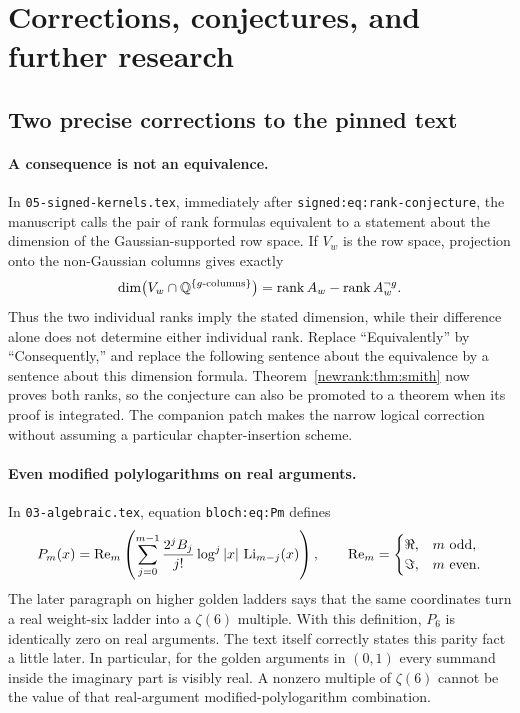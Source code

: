 \section{Corrections, conjectures, and further research}
\label{sec:research-program}

\subsection{Two precise corrections to the pinned text}

\paragraph{A consequence is not an equivalence.}
In \texttt{05-signed-kernels.tex}, immediately after
\texttt{signed:eq:rank-conjecture}, the manuscript calls the pair of rank
formulas equivalent to a statement about the dimension of the
Gaussian-supported row space. If $V_w$ is the row space, projection onto
the non-Gaussian columns gives exactly
\[
 \dim\bigl(V_w\cap\mathbb Q^{\{g\text{-columns}\}}\bigr)
 =\operatorname{rank} A_w-\operatorname{rank} A_w^{\neg g}.
\]
Thus the two individual ranks imply the stated dimension, while their
difference alone does not determine either individual rank. Replace
``Equivalently'' by ``Consequently,'' and replace the following sentence
about the equivalence by a sentence about this dimension formula.
Theorem~\ref{newrank:thm:smith} now proves both ranks, so the conjecture can
also be promoted to a theorem when its proof is integrated. The companion
patch makes the narrow logical correction without assuming a particular
chapter-insertion scheme.

\paragraph{Even modified polylogarithms on real arguments.}
In \texttt{03-algebraic.tex}, equation \texttt{bloch:eq:Pm} defines
\[
 P_m(x)=\operatorname{Re}_m\left(
       \sum_{j=0}^{m-1}\frac{2^jB_j}{j!}\log^j|x|\,\operatorname{Li}_{m-j}(x)
       \right),\qquad
 \operatorname{Re}_m=
 \begin{cases}\Re,&m\text{ odd},\\\Im,&m\text{ even}.
 \end{cases}
\]
The later paragraph on higher golden ladders says that the same
coordinates turn a real weight-six ladder into a $\zeta(6)$ multiple.
With this definition, $P_6$ is identically zero on real arguments.
The text itself correctly states this parity fact a little later. In
particular, for the golden arguments in $(0,1)$ every summand inside the
imaginary part is visibly real. A nonzero multiple of $\zeta(6)$ cannot
be the value of that real-argument modified-polylogarithm combination.

